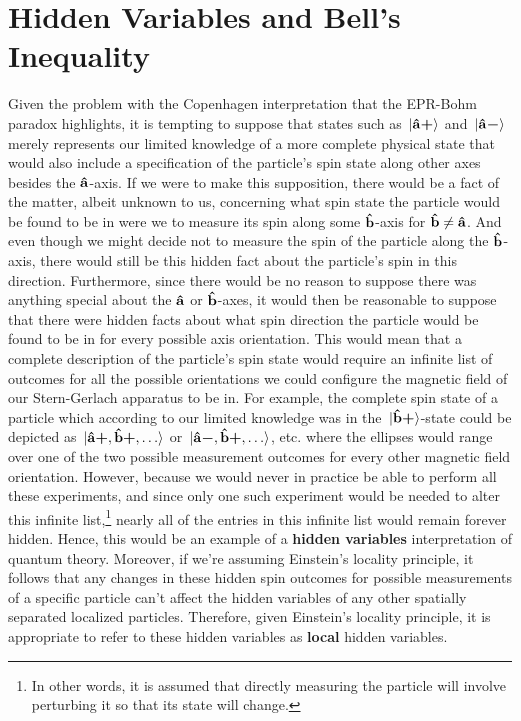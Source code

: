 \section{Hidden Variables and Bell's Inequality}
Given the problem with the Copenhagen interpretation that the EPR-Bohm paradox highlights, it is tempting to suppose that states such as $\ket*{\vb{\hat{{a}}}\bm{+}}$ and $\ket*{\vb{\hat{{a}}}\bm{-}}$ merely represents our limited knowledge of a more complete physical state that would also include a specification of the particle's spin state along other axes besides the $\vb{\hat{{a}}}$-axis. If we were to make this supposition, there would be a fact of the matter, albeit unknown to us, concerning what spin state the particle would be found to be in  were we to measure its spin along some $\vb{\hat{{b}}}$-axis for $\vb{\hat{{b}}}\neq\vb{\hat{{a}}}$. And  even though we might decide not to measure the spin of the particle along the $\vb{\hat{{b}}}$-axis, there would still be this hidden fact about the particle's spin in this direction. Furthermore, since there would be no reason to suppose there was anything special about the $\vb{\hat{{a}}}$ or $\vb{\hat{{b}}}$-axes, it would then be reasonable to suppose that there were hidden facts about what spin direction the particle would be found to be in for every possible axis orientation. This would mean that a complete description of the particle's spin state would require an infinite list of outcomes for all the possible orientations we could configure the magnetic field of our Stern-Gerlach apparatus to be in. For example, the complete spin state of a particle which according to our limited knowledge was in the $\ket*{\vb{\hat{{b}}}\bm{+}}$-state could be depicted as $\ket*{\vb{\hat{{a}}}\bm{+},\vb{\hat{{b}}}\bm{+},\ldots}$ or  $\ket*{\vb{\hat{{a}}}\bm{-},\vb{\hat{{b}}}\bm{+},\ldots}$, etc. where the ellipses would range over one of the two possible measurement outcomes for every other magnetic field orientation. However, because we would never in practice be able to perform all these experiments, and since only one such experiment would be needed to alter this infinite list,\footnote{In other words, it is assumed that directly measuring the particle will involve perturbing it so that its state will change.} nearly all of the entries in this infinite list would remain forever hidden. Hence, this would be an example of a \textbf{hidden variables} interpretation of quantum theory.  Moreover, if we're assuming Einstein's locality principle, it follows that any changes in these hidden spin outcomes for possible measurements of a specific particle can't affect the hidden variables of any other spatially separated localized particles. Therefore, given Einstein's locality principle, it is appropriate to refer to these hidden variables as \textbf{local} hidden variables.

